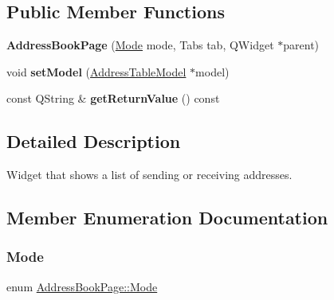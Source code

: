 \subsection*{Public Member Functions}
\begin{DoxyCompactItemize}
\item 
\mbox{\label{class_address_book_page_a493ad5adf2b6064b97bc2ba6eb41587e}} 
{\bfseries Address\+Book\+Page} (\mbox{\hyperlink{class_address_book_page_a0a8f8e590dc6f18e829fde039f984464}{Mode}} mode, Tabs tab, Q\+Widget $\ast$parent)
\item 
\mbox{\label{class_address_book_page_a1282cda9cb0300ee04c472ec4c9949f3}} 
void {\bfseries set\+Model} (\mbox{\hyperlink{class_address_table_model}{Address\+Table\+Model}} $\ast$model)
\item 
\mbox{\label{class_address_book_page_a4f6d802c63539ac335b138cca0b913d2}} 
const Q\+String \& {\bfseries get\+Return\+Value} () const
\end{DoxyCompactItemize}


\subsection{Detailed Description}
Widget that shows a list of sending or receiving addresses. 

\subsection{Member Enumeration Documentation}
\mbox{\label{class_address_book_page_a0a8f8e590dc6f18e829fde039f984464}} 
\subsubsection{\texorpdfstring{Mode}{Mode}}
{\footnotesize\ttfamily enum \mbox{\hyperlink{class_address_book_page_a0a8f8e590dc6f18e829fde039f984464}{Address\+Book\+Page\+::\+Mode}}}


